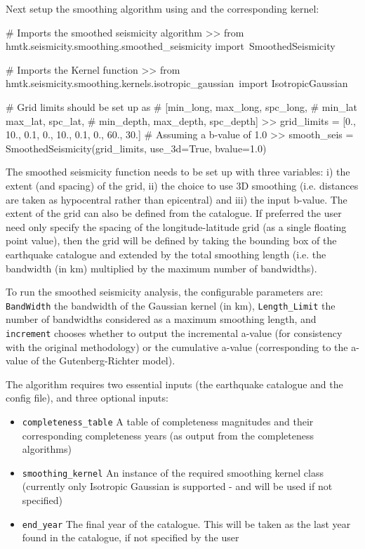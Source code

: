 Next setup the smoothing algorithm using and the corresponding kernel:

\begin{python}[frame=single]

# Imports the smoothed seismicity algorithm
>> from hmtk.seismicity.smoothing.smoothed_seismicity import\
    SmoothedSeismicity

# Imports the Kernel function
>> from hmtk.seismicity.smoothing.kernels.isotropic_gaussian\
    import IsotropicGaussian

# Grid limits should be set up as 
# [min_long, max_long, spc_long, 
#  min_lat max_lat, spc_lat,
#  min_depth, max_depth, spc_depth]
>> grid_limits = [0., 10., 0.1, 0., 10., 0.1, 0., 60., 30.]
# Assuming a b-value of 1.0
>> smooth_seis = SmoothedSeismicity(grid_limits,
                                    use_3d=True,
                                    bvalue=1.0)
\end{python}

The smoothed seismicity function needs to be set up with three variables: i) the extent (and spacing) of the grid, ii) the choice to use 3D smoothing (i.e. distances are taken as hypocentral rather than epicentral) and iii) the input b-value. The extent of the grid can also be defined from the catalogue. If preferred the user need only specify the spacing of the longitude-latitude grid (as a single floating point value), then the grid will be defined by taking the bounding box of the earthquake catalogue and extended by the total smoothing length (i.e. the bandwidth (in km) multiplied by the maximum number of bandwidths). 

To run the smoothed seismicity analysis, the configurable parameters are: \verb=BandWidth= the bandwidth of the Gaussian kernel (in km), \verb=Length_Limit= the number of bandwidths considered as a maximum smoothing length, and \verb=increment= chooses whether to output the incremental a-value (for consistency with the original \textcite{frankel1995} methodology) or the cumulative a-value (corresponding to the a-value of the Gutenberg-Richter model).


The algorithm requires two essential inputs (the earthquake catalogue and the config file), and three optional inputs:

\begin{itemize}
\item \verb=completeness_table= A table of completeness magnitudes and their corresponding completeness years (as output from the completeness algorithms)

\item \verb=smoothing_kernel= An instance of the required smoothing
kernel class (currently only Isotropic Gaussian is supported - and will be used if not specified)

\item \verb=end_year= The final year of the catalogue. This will be taken as the last year found in the catalogue, if not specified by the user
\end{itemize}

